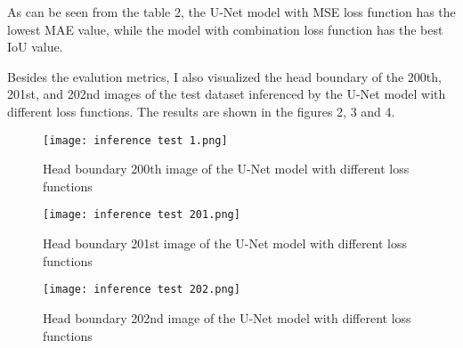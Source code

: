 \documentclass{article}
\begin{document}
\noindent As can be seen from the table 2, the U-Net model with MSE loss function has the lowest MAE value,
while the model with combination loss function has the best IoU value.

Besides the evalution metrics, I also visualized the head boundary of the 200th, 201st, and 202nd images of the test dataset
inferenced by the U-Net model with different loss functions. The results are shown in the figures 2, 3 and 4.

\begin{figure}[h]
    \centering
    \texttt{[image: inference test 1.png]}
    \caption{Head boundary 200th image of the U-Net model with different loss functions}
\end{figure}

\begin{figure}[h]
    \centering
    \texttt{[image: inference test 201.png]}
    \caption{Head boundary 201st image of the U-Net model with different loss functions}
\end{figure}

\begin{figure}[h]
    \centering
    \texttt{[image: inference test 202.png]}
    \caption{Head boundary 202nd image of the U-Net model with different loss functions}
\end{figure}
\end{document}
